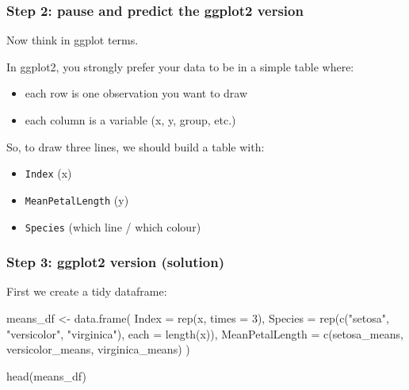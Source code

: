 \documentclass[
  letterpaper,
  DIV=11,
  numbers=noendperiod]{scrartcl}
\newenvironment{Shaded}{\begin{snugshade}}{\end{snugshade}}
\newcommand{\AttributeTok}[1]{\textcolor[rgb]{0.40,0.45,0.13}{#1}}
\newcommand{\DecValTok}[1]{\textcolor[rgb]{0.68,0.00,0.00}{#1}}
\newcommand{\FunctionTok}[1]{\textcolor[rgb]{0.28,0.35,0.67}{#1}}
\newcommand{\NormalTok}[1]{\textcolor[rgb]{0.00,0.23,0.31}{#1}}
\newcommand{\OtherTok}[1]{\textcolor[rgb]{0.00,0.23,0.31}{#1}}
\newcommand{\StringTok}[1]{\textcolor[rgb]{0.13,0.47,0.30}{#1}}
\providecommand{\tightlist}{%
  \setlength{\itemsep}{0pt}\setlength{\parskip}{0pt}}\usepackage{longtable,booktabs,array}
\begin{document}
\subsubsection{Step 2: pause and predict the ggplot2
version}\label{step-2-pause-and-predict-the-ggplot2-version-1}

Now think in ggplot terms.

In ggplot2, you strongly prefer your data to be in a simple table where:

\begin{itemize}
\tightlist
\item
  each row is one observation you want to draw
\item
  each column is a variable (x, y, group, etc.)
\end{itemize}

So, to draw three lines, we should build a table with:

\begin{itemize}
\tightlist
\item
  \texttt{Index} (x)
\item
  \texttt{MeanPetalLength} (y)
\item
  \texttt{Species} (which line / which colour)
\end{itemize}

\subsubsection{Step 3: ggplot2 version
(solution)}\label{step-3-ggplot2-version-solution-1}

First we create a tidy dataframe:

\begin{Shaded}
\begin{Highlighting}[]
\NormalTok{means\_df }\OtherTok{\textless{}{-}} \FunctionTok{data.frame}\NormalTok{(}
  \AttributeTok{Index =} \FunctionTok{rep}\NormalTok{(x, }\AttributeTok{times =} \DecValTok{3}\NormalTok{),}
  \AttributeTok{Species =} \FunctionTok{rep}\NormalTok{(}\FunctionTok{c}\NormalTok{(}\StringTok{"setosa"}\NormalTok{, }\StringTok{"versicolor"}\NormalTok{, }\StringTok{"virginica"}\NormalTok{), }\AttributeTok{each =} \FunctionTok{length}\NormalTok{(x)),}
  \AttributeTok{MeanPetalLength =} \FunctionTok{c}\NormalTok{(setosa\_means, versicolor\_means, virginica\_means)}
\NormalTok{)}

\FunctionTok{head}\NormalTok{(means\_df)}
\end{Highlighting}
\end{Shaded}
\end{document}
